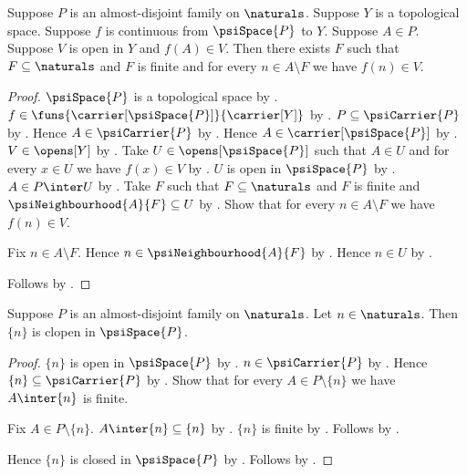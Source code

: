 \begin{lemma}\label{psi_continuous_family_point_tail}
    Suppose $P$ is an almost-disjoint family on $\naturals$.
    Suppose $Y$ is a topological space.
    Suppose $f$ is continuous from $\psiSpace{P}$ to $Y$.
    Suppose $A\in P$.
    Suppose $V$ is open in $Y$ and $f(A)\in V$.
    Then there exists $F$ such that
        $F\subseteq\naturals$ and $F$ is finite and
        for every $n\in A\setminus F$ we have $f(n)\in V$.
\end{lemma}
\begin{proof}
    $\psiSpace{P}$ is a topological space
        by .
    $f\in\funs{\carrier[\psiSpace{P}]}{\carrier[Y]}$
        by .
    $P\subseteq\psiCarrier{P}$ by .
    Hence $A\in\psiCarrier{P}$ by .
    Hence $A\in\carrier[\psiSpace{P}]$ by .
    $V\in\opens[Y]$ by .
    Take $U\in\opens[\psiSpace{P}]$ such that $A\in U$ and
        for every $x\in U$ we have $f(x)\in V$
        by .
    $U$ is open in $\psiSpace{P}$ by .
    $A\in P\inter U$ by .
    Take $F$ such that $F\subseteq\naturals$ and $F$ is finite and
        $\psiNeighbourhood{A}{F}\subseteq U$
        by .
    Show that for every $n\in A\setminus F$ we have $f(n)\in V$.
    \begin{subproof}
        Fix $n\in A\setminus F$.
        Hence $n\in\psiNeighbourhood{A}{F}$
            by .
        Hence $n\in U$ by .
    \end{subproof}
    Follows by \auto.
\end{proof}

\begin{theorem}\label{psi_natural_singleton_clopen}
    Suppose $P$ is an almost-disjoint family on $\naturals$.
    Let $n\in\naturals$.
    Then $\{n\}$ is clopen in $\psiSpace{P}$.
\end{theorem}
\begin{proof}
    $\{n\}$ is open in $\psiSpace{P}$ by .
    $n\in\psiCarrier{P}$ by
        .
    Hence $\{n\}\subseteq\psiCarrier{P}$
        by .
    Show that for every $A\in P\setminus\{n\}$ we have
        $A\inter\{n\}$ is finite.
    \begin{subproof}
        Fix $A\in P\setminus\{n\}$.
        $A\inter\{n\}\subseteq\{n\}$ by .
        $\{n\}$ is finite by .
        Follows by .
    \end{subproof}
    Hence $\{n\}$ is closed in $\psiSpace{P}$ by .
    Follows by .
\end{proof}

